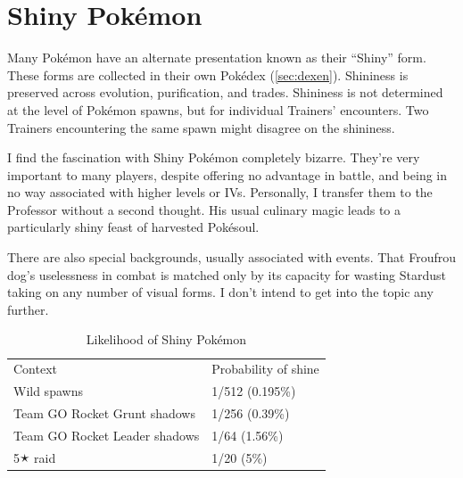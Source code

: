 \section{Shiny Pokémon}
\label{sec:shiny}
Many Pokémon have an alternate presentation known as their ``Shiny'' form.
These forms are collected in their own Pokédex (\autoref{sec:dexen}).
Shininess is preserved across evolution, purification, and trades.
Shininess is not determined at the level of Pokémon spawns, but for individual
  Trainers' encounters.
Two Trainers encountering the same spawn might disagree on the shininess.

I find the fascination with Shiny Pokémon completely bizarre.
They're very important to many players, despite offering no advantage in battle,
  and being in no way associated with higher levels or IVs.
Personally, I transfer them to the Professor without a second thought.
His usual culinary magic leads to a particularly shiny feast of harvested Pokésoul.

There are also special backgrounds, usually associated with events.
That Froufrou dog's uselessness in combat is matched only by its
  capacity for wasting Stardust taking on any number of visual forms.
I don't intend to get into the topic any further.
\begin{table}[ht]
\begin{center}
\begin{tabular}{ll}
Context & Probability of shine \\
\Midrule
  Wild spawns & 1/512 (0.195\%) \\
  Team GO Rocket Grunt shadows & 1/256 (0.39\%) \\
  Team GO Rocket Leader shadows & 1/64 (1.56\%) \\
  5🟉 raid & 1/20 (5\%) \\
\end{tabular}
\end{center}
\caption{Likelihood of Shiny Pokémon}
\label{table:shiny}
\end{table}


